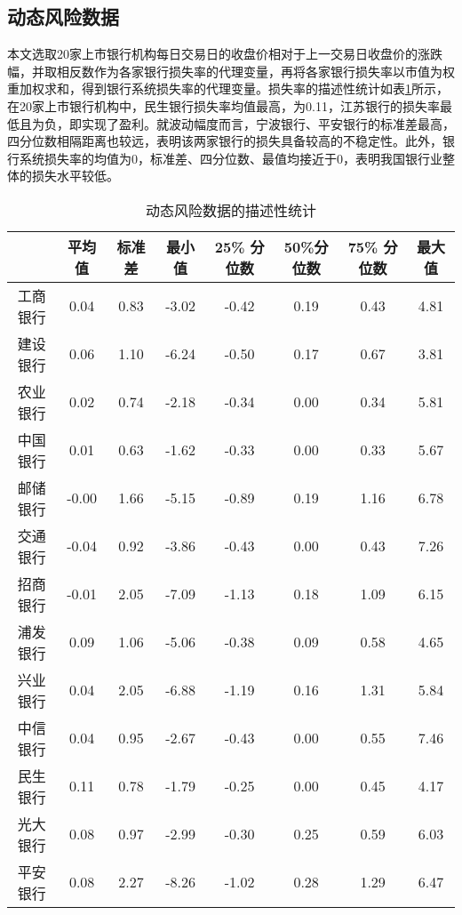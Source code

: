 \documentclass[lang=cn]{elegantpaper}
\begin{document}
\subsection{动态风险数据}
本文选取20家上市银行机构每日交易日的收盘价相对于上一交易日收盘价的涨跌幅，并取相反数作为各家银行损失率的代理变量，再将各家银行损失率以市值为权重加权求和，得到银行系统损失率的代理变量。损失率的描述性统计如表\ref{表5}所示，在20家上市银行机构中，民生银行损失率均值最高，为0.11，江苏银行的损失率最低且为负，即实现了盈利。就波动幅度而言，宁波银行、平安银行的标准差最高，四分位数相隔距离也较远，表明该两家银行的损失具备较高的不稳定性。此外，银行系统损失率的均值为0，标准差、四分位数、最值均接近于0，表明我国银行业整体的损失水平较低。

\setlength{\tabcolsep}{9.7pt}
\begin{longtable}{cccccccc}
    \caption{动态风险数据的描述性统计}
    \label{表5}\\
    \toprule
         & 平均值   & 标准差  & 最小值    & 25\% 分位数 & 50\%分位数 & 75\% 分位数 & 最大值  \\ \midrule
    \endhead
    \bottomrule
    \endfoot
    \endlastfoot
    工商银行 & 0.04  & 0.83 & -3.02  & -0.42    & 0.19    & 0.43     & 4.81 \\
    建设银行 & 0.06  & 1.10 & -6.24  & -0.50    & 0.17    & 0.67     & 3.81 \\
    农业银行 & 0.02  & 0.74 & -2.18  & -0.34    & 0.00    & 0.34     & 5.81 \\
    中国银行 & 0.01  & 0.63 & -1.62  & -0.33    & 0.00    & 0.33     & 5.67 \\
    邮储银行 & -0.00 & 1.66 & -5.15  & -0.89    & 0.19    & 1.16     & 6.78 \\
    交通银行 & -0.04 & 0.92 & -3.86  & -0.43    & 0.00    & 0.43     & 7.26 \\
    招商银行 & -0.01 & 2.05 & -7.09  & -1.13    & 0.18    & 1.09     & 6.15 \\
    浦发银行 & 0.09  & 1.06 & -5.06  & -0.38    & 0.09    & 0.58     & 4.65 \\
    兴业银行 & 0.04  & 2.05 & -6.88  & -1.19    & 0.16    & 1.31     & 5.84 \\
    中信银行 & 0.04  & 0.95 & -2.67  & -0.43    & 0.00    & 0.55     & 7.46 \\
    民生银行 & 0.11  & 0.78 & -1.79  & -0.25    & 0.00    & 0.45     & 4.17 \\
    光大银行 & 0.08  & 0.97 & -2.99  & -0.30    & 0.25    & 0.59     & 6.03 \\
    平安银行 & 0.08  & 2.27 & -8.26  & -1.02    & 0.28    & 1.29     & 6.47 \\

\end{longtable}
\end{document}

